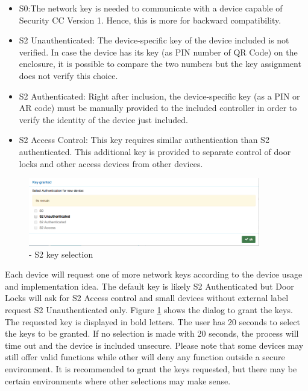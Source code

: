 \begin{itemize}
\item S0:The network key is needed to communicate with a device capable of Security CC 
Version 1. Hence, this is more for backward compatibility.
\item S2 Unauthenticated: The device-specific key of the device included is not verified. 
In case the device has its key (as PIN number of QR Code) on the enclosure, it is possible 
to compare the two numbers but the key assignment does not verify this choice.
\item S2 Authenticated: Right after inclusion, the device-specific key (as a PIN or AR code) 
must be manually provided to the included controller in order to verify the identity of the device just included.
\item S2 Access Control: This key requires similar authentication than S2 authenticated.
 This additional key is provided to separate control of door locks and other access devices from other devices.
\end{itemize}

\begin{figure}
\begin{center}
\includegraphics[width=0.9\textwidth]{pngs/cap7/security2_2.png}
\caption{\zweui - S2 key selection}
\label{security2_2}
\end{center}
\end{figure}

Each device will request one of more network keys according to the device 
usage and implementation idea. The default key is likely  S2 Authenticated but Door Locks 
will ask for S2 Access control and small devices without external label request S2 
Unauthenticated only. Figure \ref{security2_2} shows the dialog to grant the keys. The 
requested key is displayed in bold letters. The user has 20 seconds to select the keys to be granted.
If no selection is made with 20 seconds, the process will time out and the device is 
included unsecure. Please note that some devices may still offer valid functions 
while other will deny any function outside a secure environment. It is recommended 
to grant the keys requested, but there may be certain environments where other 
selections may make sense.

